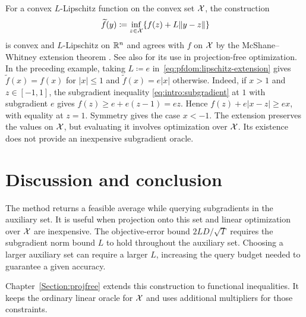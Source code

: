 For a convex $L$-Lipschitz function on the convex set $\mathcal{X}$, the
construction
\begin{equation}\label{eq:pfdom:lipschitz-extension}
 \widetilde f(y)\coloneqq\inf_{z\in\mathcal{X}}\{f(z)+L\|y-z\|\}
\end{equation}
is convex and $L$-Lipschitz on $\mathbb{R}^n$ and agrees with $f$ on $\mathcal{X}$
by the McShane--Whitney extension theorem
\cite[Theorem~2.3 and Proposition~3.2]{lmcs:6105}. See also
\cite[Appendix~D]{asgari2024nonsmooth} for its use in projection-free
optimization. In the preceding example, taking $L\coloneqq e$
in~\eqref{eq:pfdom:lipschitz-extension} gives
$\widetilde f(x)=f(x)$ for $|x|\leq1$ and $\widetilde f(x)=e|x|$ otherwise.
Indeed, if $x>1$ and $z\in[-1,1]$, the subgradient inequality
\eqref{eq:intro:subgradient} at $1$ with subgradient $e$ gives
$f(z)\geq e+e(z-1)=ez$. Hence
$f(z)+e|x-z|\geq ex$, with equality at $z=1$. Symmetry gives the case $x<-1$.
The extension preserves the values on $\mathcal{X}$, but evaluating it involves
optimization over $\mathcal{X}$. Its existence does not provide an inexpensive
subgradient oracle.

\section{Discussion and conclusion}
\label{sec:pfdom:discussion}

The method returns a feasible average while querying subgradients
in the auxiliary set. It is useful when projection
onto this set and linear optimization over $\mathcal{X}$ are inexpensive.
The objective-error bound $2LD/\sqrt T$ requires the subgradient norm bound
$L$ to hold throughout the auxiliary set. Choosing a larger auxiliary set
can require a larger $L$, increasing the query budget needed to guarantee
a given accuracy.

Chapter~\ref{Section:projfree} extends this construction to functional
inequalities. It keeps the ordinary linear oracle for $\mathcal{X}$ and uses
additional multipliers for those constraints.
